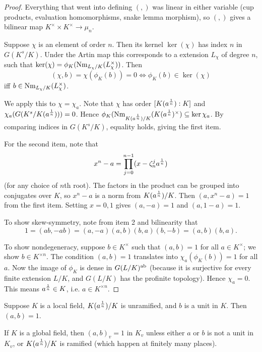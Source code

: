 \begin{proof}
Everything that went into defining $(,)$ was linear in either variable (cup products, evaluation homomorphisms, snake lemma morphism), so $(,)$ gives a bilinear map $K^{\times}\times K^{\times}\to \mu_n$.

Suppose $\chi$ is an element of order $n$. Then its kernel $\ker(\chi)$ has index $n$ in $G(K^s/K)$. Under the Artin map this corresponds to a extension $L_{\chi}$ of degree $n$, such that $\ker(\chi) = \phi_K(\operatorname{Nm}_{L_{\chi}/K} (L_{\chi}^{\times}))$.  
Then
\[(\chi,b)=\chi(\phi_K(b))=0\iff \phi_K(b)\in \ker(\chi)\]
iff $b\in \operatorname{Nm}_{L_{\chi}/K} (L_{\chi}^{\times})$.

We apply this to $\chi=\chi_a$. Note that $\chi$ has order $[K(a^{\frac{1}{n}}):K]$ and $\chi_a(G(K^s/K(a^{\frac{1}{n}})))=0$. Hence $\phi_K(\operatorname{Nm}_{K(a^{\frac{1}{n}})/K}(K(a^{\frac{1}{n}})^{\times})\subseteq \ker\chi_a$. By comparing indices in $G(K^s/K)$, equality holds, giving the first item.

For the second item, note that
\[
x^n-a=\prod_{j=0}^{n-1} (x-\zeta_n^j a^{\frac{1}{n}})
\]
(for any choice of $n$th root). The factors in the product can be grouped into conjugates over $K$, so $x^n-a$ is a norm from $K(a^{\frac{1}{n}})/K$. Then $(a,x^n-a)=1$ from the first item. Setting $x=0,1$ gives $(a,-a)=1$ and $(a,1-a)=1$.

To show skew-symmetry, note from item 2 and bilinearity that
\[
1=(ab,-ab)=(a,-a)(a,b)(b,a)(b,-b)=(a,b)(b,a).
\]

To show nondegeneracy, suppose $b\in K^{\times}$ such that $(a,b)=1$ for all $a\in K^{\times}$; we show $b\in K^{\times n}$. The condition $(a,b)=1$ translates into $\chi_a(\phi_{K}(b))=1$ for all $a$. Now the image of $\phi_K$ is dense in $G(L/K)^{\text{ab}}$ (because it is surjective for every finite extension $L/K$, and $G(L/K)$ has the profinite topology). Hence $\chi_a=0$. This means $a^{\frac{1}{n}}\in K$, i.e. $a\in K^{\times n}$.
\end{proof}
\begin{cor}
Suppose $K$ is a local field, $K(a^{\frac{1}{n}})/K$ is unramified, and $b$ is a unit in $K$. Then $(a,b)=1$.

If $K$ is a global field, then $(a,b)_v=1$ in $K_v$ unless either $a$ or $b$ is not a unit in $K_v$, or $K(a^{\frac{1}{n}})/K$ is ramified (which happen at finitely many places).
\end{cor}
